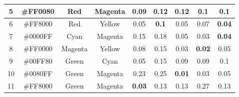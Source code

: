 \begin{table}[htbp]
{\begin{tabular}{@{}ccccccccc@{}}
    \multicolumn{1}{|c|}{5}  & \multicolumn{1}{c|}{\cellcolor[HTML]{FF0080}\#FF0080} & \multicolumn{1}{c|}{Red}     & \multicolumn{1}{c||}{Magenta} & \multicolumn{1}{c|}{0.09}          & \multicolumn{1}{c|}{0.12}         & \multicolumn{1}{c|}{0.12}          & \multicolumn{1}{c|}{0.1}           & \multicolumn{1}{c|}{0.1}           \\ \midrule
    \multicolumn{1}{|c|}{6}  & \multicolumn{1}{c|}{\cellcolor[HTML]{FF8000}\#FF8000} & \multicolumn{1}{c|}{Red}     & \multicolumn{1}{c||}{Yellow}  & \multicolumn{1}{c|}{0.05}          & \multicolumn{1}{c|}{\textbf{0.1}} & \multicolumn{1}{c|}{0.05}          & \multicolumn{1}{c|}{0.07}          & \multicolumn{1}{c|}{\textbf{0.04}} \\ \midrule
    \multicolumn{1}{|c|}{7}  & \multicolumn{1}{c|}{\cellcolor[HTML]{0000FF}\#0000FF} & \multicolumn{1}{c|}{Cyan}    & \multicolumn{1}{c||}{Magenta} & \multicolumn{1}{c|}{0.15}          & \multicolumn{1}{c|}{0.18}         & \multicolumn{1}{c|}{0.05}          & \multicolumn{1}{c|}{0.03}          & \multicolumn{1}{c|}{\textbf{0.04}} \\ \midrule
    \multicolumn{1}{|c|}{8}  & \multicolumn{1}{c|}{\cellcolor[HTML]{FF0000}\#FF0000} & \multicolumn{1}{c|}{Magenta} & \multicolumn{1}{c||}{Yellow}  & \multicolumn{1}{c|}{0.08}          & \multicolumn{1}{c|}{0.15}         & \multicolumn{1}{c|}{0.03}          & \multicolumn{1}{c|}{\textbf{0.02}} & \multicolumn{1}{c|}{0.05}          \\ \midrule
    \multicolumn{1}{|c|}{9}  & \multicolumn{1}{c|}{\cellcolor[HTML]{00FF80}\#00FF80} & \multicolumn{1}{c|}{Green}   & \multicolumn{1}{c||}{Cyan}    & \multicolumn{1}{c|}{0.05}          & \multicolumn{1}{c|}{0.15}         & \multicolumn{1}{c|}{0.09}          & \multicolumn{1}{c|}{0.09}          & \multicolumn{1}{c|}{0.1}           \\ \midrule
    \multicolumn{1}{|c|}{10} & \multicolumn{1}{c|}{\cellcolor[HTML]{0080FF}\#0080FF} & \multicolumn{1}{c|}{Green}   & \multicolumn{1}{c||}{Magenta} & \multicolumn{1}{c|}{0.23}          & \multicolumn{1}{c|}{0.25}         & \multicolumn{1}{c|}{\textbf{0.01}} & \multicolumn{1}{c|}{0.03}          & \multicolumn{1}{c|}{0.05}          \\ \midrule
    \multicolumn{1}{|c|}{11} & \multicolumn{1}{c|}{\cellcolor[HTML]{FF8000}\#FF8000} & \multicolumn{1}{c|}{Green}   & \multicolumn{1}{c||}{Magenta} & \multicolumn{1}{c|}{\textbf{0.03}} & \multicolumn{1}{c|}{0.13}         & \multicolumn{1}{c|}{0.13}          & \multicolumn{1}{c|}{0.27}          & \multicolumn{1}{c|}{0.13}          \\ \midrule

\end{tabular}}
\end{table}

